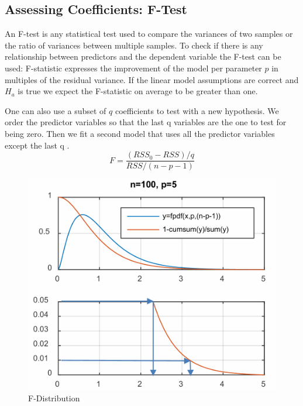 \documentclass[../Main.tex]{subfiles}
\begin{document}
\subsection{Assessing Coefficients: F-Test}
An F-test is any statistical test used to compare the variances of two samples or the ratio of variances between multiple samples. To check if there is any relationship between predictors and the dependent variable the F-test can be used:
F-statistic expresses the improvement of the model per parameter \(p\) in multiples of the residual variance. If the linear model assumptions are correct and \(H_a\) is true we expect the F-statistic on average to be greater than one.

One can also use a subset of \(q\) coefficients to test with a new hypothesis. We order the predictor variables so that the last q variables are the one to test for being zero. Then we fit a second model that uses all the predictor variables except the last q .
\begin{equation}
    F = \frac{(RSS_0-RSS)/q}{RSS/(n-p-1)}
\end{equation}

\begin{figure}[H]
    \centering
    \includegraphics[width=0.75\linewidth]{Images/f-dist.png}
    \caption{F-Distribution}
\end{figure}
\end{document}
